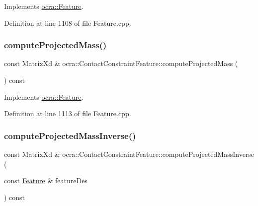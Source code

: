 Implements \hyperlink{classocra_1_1Feature_a44e11dd349e92971fefebff354e7214b}{ocra\+::\+Feature}.



Definition at line 1108 of file Feature.\+cpp.

\hypertarget{classocra_1_1ContactConstraintFeature_ab926340d6c6d00b1358ae99432e15398}{}\label{classocra_1_1ContactConstraintFeature_ab926340d6c6d00b1358ae99432e15398} 
\subsubsection{\texorpdfstring{compute\+Projected\+Mass()}{computeProjectedMass()}\hspace{0.1cm}{\footnotesize\ttfamily [2/2]}}
{\footnotesize\ttfamily const Matrix\+Xd \& ocra\+::\+Contact\+Constraint\+Feature\+::compute\+Projected\+Mass (\begin{DoxyParamCaption}{ }\end{DoxyParamCaption}) const\hspace{0.3cm}{\ttfamily [virtual]}}



Implements \hyperlink{classocra_1_1Feature_a99ac023809c0cf34b5d582537934b08c}{ocra\+::\+Feature}.



Definition at line 1113 of file Feature.\+cpp.

\hypertarget{classocra_1_1ContactConstraintFeature_a9bdfabb746abff207ff9cc3e9c968c81}{}\label{classocra_1_1ContactConstraintFeature_a9bdfabb746abff207ff9cc3e9c968c81} 
\subsubsection{\texorpdfstring{compute\+Projected\+Mass\+Inverse()}{computeProjectedMassInverse()}\hspace{0.1cm}{\footnotesize\ttfamily [1/2]}}
{\footnotesize\ttfamily const Matrix\+Xd \& ocra\+::\+Contact\+Constraint\+Feature\+::compute\+Projected\+Mass\+Inverse (\begin{DoxyParamCaption}\item[{const \hyperlink{classocra_1_1Feature}{Feature} \&}]{feature\+Des }\end{DoxyParamCaption}) const\hspace{0.3cm}{\ttfamily [virtual]}}



